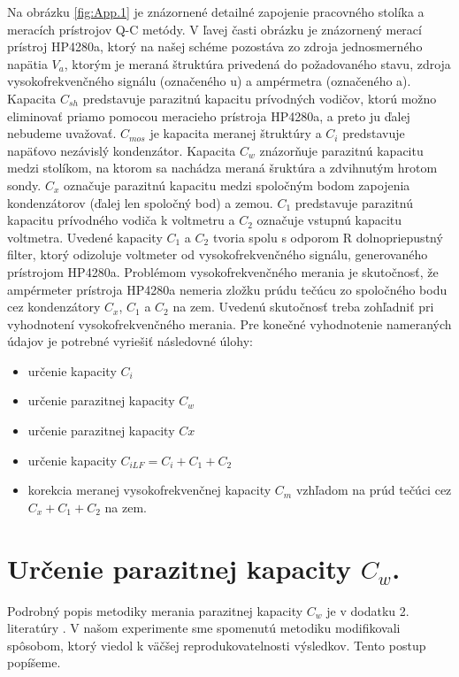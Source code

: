 \par Na obrázku \ref{fig:App.1} je znázornené detailné zapojenie
pracovného stolíka a meracích prístrojov Q-C metódy. V ľavej časti
obrázku je znázornený merací prístroj HP4280a, ktorý na našej schéme
pozostáva zo zdroja jednosmerného napätia $V_a$, ktorým je meraná
štruktúra privedená do požadovaného stavu, zdroja vysokofrekvenčného
signálu (označeného u) a ampérmetra (označeného a).  Kapacita $C_{sh}$
predstavuje parazitnú kapacitu prívodných vodičov, ktorú možno
eliminovať priamo pomocou meracieho prístroja HP4280a, a preto ju
ďalej nebudeme uvažovať. $C_{mos}$ je kapacita meranej štruktúry a $C_i$
predstavuje napäťovo nezávislý kondenzátor. Kapacita $C_w$ znázorňuje
parazitnú kapacitu medzi stolíkom, na ktorom sa nachádza meraná
šruktúra a zdvihnutým hrotom sondy. $C_x$ označuje parazitnú kapacitu
medzi spoločným bodom zapojenia kondenzátorov (ďalej len spoločný bod)
a zemou.  $C_1$ predstavuje parazitnú kapacitu prívodného vodiča k
voltmetru a $C_2$ označuje vstupnú kapacitu voltmetra.  Uvedené
kapacity $C_1$ a $C_2$ tvoria spolu s odporom R dolnopriepustný
filter, ktorý odizoluje voltmeter od vysokofrekvenčného signálu,
generovaného prístrojom HP4280a. Problémom vysokofrekvenčného merania
je skutočnosť, že ampérmeter prístroja HP4280a nemeria zložku prúdu
tečúcu zo spoločného bodu cez kondenzátory $C_x$, $C_1$ a $C_2$ na
zem. Uvedenú skutočnosť treba zohľadniť pri vyhodnotení
vysokofrekvenčného merania. Pre konečné vyhodnotenie nameraných údajov
je potrebné vyriešiť následovné úlohy:

\begin{itemize}
\item určenie kapacity $C_i$
\item určenie parazitnej kapacity $C_w$
\item určenie parazitnej kapacity $Cx$
\item určenie kapacity $C_{iLF}  = C_i  + C_1  + C_2$
\item korekcia meranej vysokofrekvenčnej kapacity $C_m$ vzhľadom na prúd
  tečúci cez $C_x + C_1 + C_2$ na zem.
\end{itemize}


\section{Určenie parazitnej kapacity $C_w$.}\label{sec:E.1}

Podrobný popis metodiky merania parazitnej kapacity $C_w$ je v dodatku
2. literatúry \cite{App.2}. V našom experimente sme spomenutú metodiku
modifikovali spôsobom, ktorý viedol k väčšej reprodukovatelnosti
výsledkov. Tento postup popíšeme.

